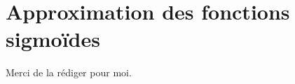 
\cleardoublepage
{}
\chapter{Approximation des fonctions sigmoïdes}\label{annexe:approx}

Merci de la rédiger pour moi.